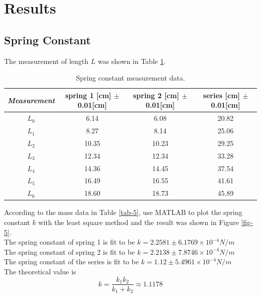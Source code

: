 \documentclass{article}
\begin{document}
\newpage

\section{Results}

\subsection{Spring Constant}

The measurement of length $L$ was shown in Table \ref{tab-1}.\\

\begin{table}[!h]
\begin{center}
\begin{tabular}{|c|c|c|c|}
\hline
\textit{Measurement} & spring 1 [cm] $\pm$ 0.01[cm] &
spring 2 [cm] $\pm$ 0.01[cm] & series [cm] $\pm$ 0.01[cm]\\
\hline
$L_0$	&	6.14	&	6.08	&	20.82\\
$L_1$	&	8.27	&	8.14	&	25.06\\
$L_2$	&	10.35	&	10.23	&	29.25\\
$L_3$	&	12.34	&	12.34	&	33.28\\
$L_4$	&	14.36	&	14.45	&	37.54\\
$L_5$	&	16.49	&	16.55	&	41.61\\
$L_6$	&	18.60	&	18.73	&	45.89\\
\hline
\end{tabular}
\caption{Spring constant measurement data.}
\label{tab-1}
\end{center}
\end{table}

According to the mass data in Table \ref{tab-5}, use MATLAB to plot the spring constant $k$ with the least square method and the result was shown in Figure \ref{fig-5}.\\

The spring constant of spring 1 is fit to be $k=2.2581\pm6.1769\times10^{-4}N/m$\\

The spring constant of spring 2 is fit to be $k=2.2138\pm7.8746\times10^{-4}N/m$\\

The spring constant of the series is fit to be $k=1.12\pm5.4961\times10^{-4}N/m$\\

The theoretical value is $$k=\frac{k_1k_2}{k_1+k_2}\approx1.1178$$
\end{document}
